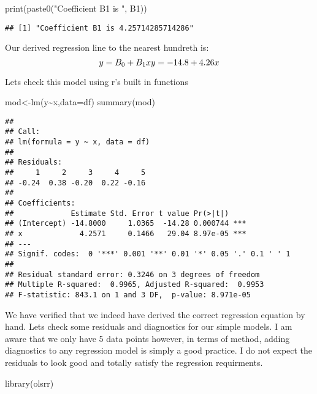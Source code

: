 \documentclass[
]{article}
\newenvironment{Shaded}{\begin{snugshade}}{\end{snugshade}}
\newcommand{\AttributeTok}[1]{\textcolor[rgb]{0.77,0.63,0.00}{#1}}
\newcommand{\FunctionTok}[1]{\textcolor[rgb]{0.00,0.00,0.00}{#1}}
\newcommand{\NormalTok}[1]{#1}
\newcommand{\OtherTok}[1]{\textcolor[rgb]{0.56,0.35,0.01}{#1}}
\newcommand{\SpecialCharTok}[1]{\textcolor[rgb]{0.00,0.00,0.00}{#1}}
\newcommand{\StringTok}[1]{\textcolor[rgb]{0.31,0.60,0.02}{#1}}
\begin{document}
\begin{Shaded}
\begin{Highlighting}[]
\FunctionTok{print}\NormalTok{(}\FunctionTok{paste0}\NormalTok{(}\StringTok{"Coefficient B1 is "}\NormalTok{, B1))}
\end{Highlighting}
\end{Shaded}

\begin{verbatim}
## [1] "Coefficient B1 is 4.25714285714286"
\end{verbatim}

Our derived regression line to the nearest hundreth is: \[
y=B_0+B_1x\\
y=-14.8+4.26x
\]

Lets check this model using r's built in functions

\begin{Shaded}
\begin{Highlighting}[]
\NormalTok{mod}\OtherTok{\textless{}{-}}\FunctionTok{lm}\NormalTok{(y}\SpecialCharTok{\textasciitilde{}}\NormalTok{x,}\AttributeTok{data=}\NormalTok{df)}
\FunctionTok{summary}\NormalTok{(mod)}
\end{Highlighting}
\end{Shaded}

\begin{verbatim}
## 
## Call:
## lm(formula = y ~ x, data = df)
## 
## Residuals:
##     1     2     3     4     5 
## -0.24  0.38 -0.20  0.22 -0.16 
## 
## Coefficients:
##             Estimate Std. Error t value Pr(>|t|)    
## (Intercept) -14.8000     1.0365  -14.28 0.000744 ***
## x             4.2571     0.1466   29.04 8.97e-05 ***
## ---
## Signif. codes:  0 '***' 0.001 '**' 0.01 '*' 0.05 '.' 0.1 ' ' 1
## 
## Residual standard error: 0.3246 on 3 degrees of freedom
## Multiple R-squared:  0.9965, Adjusted R-squared:  0.9953 
## F-statistic: 843.1 on 1 and 3 DF,  p-value: 8.971e-05
\end{verbatim}

We have verified that we indeed have derived the correct regression
equation by hand. Lets check some residuals and diagnostics for our
simple models. I am aware that we only have 5 data points however, in
terms of method, adding diagnostics to any regression model is simply a
good practice. I do not expect the residuals to look good and totally
satisfy the regression requirments.

\begin{Shaded}
\begin{Highlighting}[]
\FunctionTok{library}\NormalTok{(olsrr)}
\end{Highlighting}
\end{Shaded}
\end{document}
